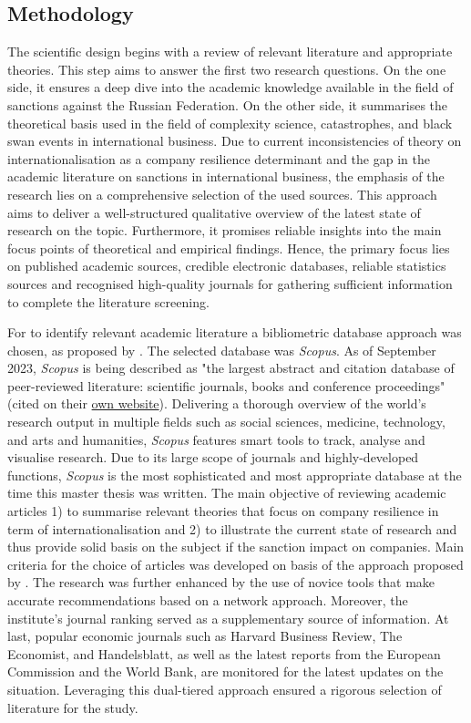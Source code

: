 \documentclass[12pt,a4paper]{article}
\begin{document}
  \subsection{Methodology}
\label{subchap:intro_methodology}
The scientific design begins with a review of relevant literature and appropriate theories. This step aims to answer the first two research questions. On the one side, it ensures a deep dive into the academic knowledge available in the field of sanctions against the Russian Federation. On the other side, it summarises the theoretical basis used in the field of complexity science, catastrophes, and black swan events in international business. Due to current inconsistencies of theory on internationalisation as a company resilience determinant and the gap in the academic literature on sanctions in international business, the emphasis of the research lies on a comprehensive selection of the used sources. This approach aims to deliver a well-structured qualitative overview of the latest state of research on the topic. Furthermore, it promises reliable insights into the main focus points of theoretical and empirical findings. Hence, the primary focus lies on published academic sources, credible electronic databases, reliable statistics sources and recognised high-quality journals for gathering sufficient information to complete the literature screening. 

For to identify relevant academic literature a bibliometric database approach was chosen, as proposed by \cite{hiebl_sample_2023}. The selected database was \textit{Scopus}. As of September 2023, \textit{Scopus} is being described as "the largest abstract and citation database of peer-reviewed literature: scientific journals, books and conference proceedings" (cited on their \href{https://service.elsevier.com/app/answers/detail/a_id/15100/supporthub/scopus/}{own website}). Delivering a thorough overview of the world's research output in multiple fields such as social sciences, medicine, technology, and arts and humanities, \textit{Scopus} features smart tools to track, analyse and visualise research. Due to its large scope of journals and highly-developed functions, \textit{Scopus} is the most sophisticated and most appropriate database at the time this master thesis was written. The main objective of reviewing academic articles 1) to summarise relevant theories that focus on company resilience in term of internationalisation and 2) to illustrate the current state of research and thus provide solid basis on the subject if the sanction impact on companies. Main criteria for the choice of articles was developed on basis of the approach proposed by \cite{tuselmann_revisiting_2016}. The research was further enhanced by the use of novice tools that make accurate recommendations based on a network approach. Moreover, the institute's journal ranking served as a supplementary source of information. At last, popular economic journals such as Harvard Business Review, The Economist, and Handelsblatt, as well as the latest reports from the European Commission and the World Bank, are monitored for the latest updates on the situation. Leveraging this dual-tiered approach ensured a rigorous selection of literature for the study.  
\end{document}
